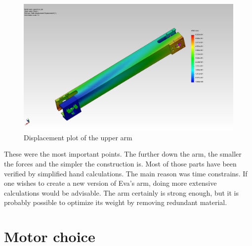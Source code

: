 \documentclass[technical_document.tex]{subfiles}
\begin{document}
\begin{figure}[ht!]
	\centering
	\mbox{\includegraphics[scale=0.3]{Images/upperArm_bar_displace.jpg}}
	\caption{Displacement plot of the upper arm}
	\label{fig:upperArm_displace}
\end{figure}

These were the most important points. The further down the arm, the smaller the forces and the simpler the construction is. Most of those parts have been verified by simplified hand calculations. The main reason was time constrains. If one wishes to create a new version of Eva’s arm, doing more extensive calculations would be advisable. The arm certainly is strong enough, but it is probably possible to optimize its weight by removing redundant material.


\section{Motor choice}



 
\end{document}
